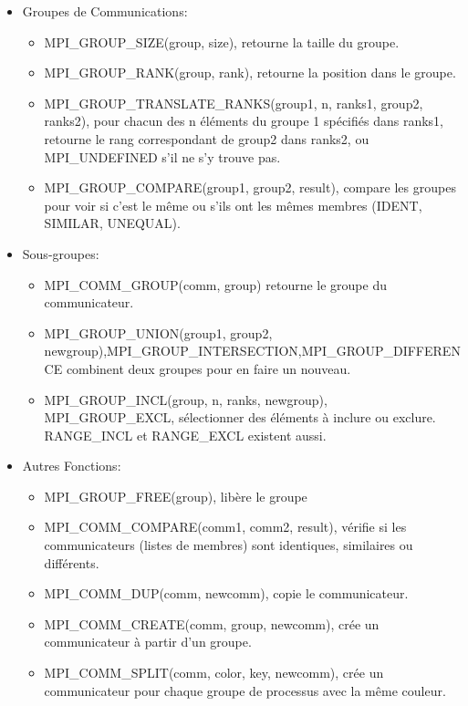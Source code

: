 \documentclass[oneside]{book}
\begin{document}
\begin{itemize}
\item Groupes de Communications:\\
\begin{itemize}
\item MPI\_GROUP\_SIZE(group, size), retourne la taille du groupe.
\item MPI\_GROUP\_RANK(group, rank), retourne la position dans le groupe.
\item MPI\_GROUP\_TRANSLATE\_RANKS(group1, n, ranks1, group2,
ranks2), pour chacun des n éléments du groupe 1 spécifiés
dans ranks1, retourne le rang correspondant de group2 dans
ranks2, ou MPI\_UNDEFINED s'il ne s'y trouve pas.
\item MPI\_GROUP\_COMPARE(group1, group2, result), compare les
groupes pour voir si c'est le même ou s'ils ont les mêmes
membres (IDENT, SIMILAR, UNEQUAL).
\end{itemize}
\item Sous-groupes:\\
\begin{itemize}
\item MPI\_COMM\_GROUP(comm, group) retourne le groupe du
communicateur.
\item MPI\_GROUP\_UNION(group1, group2, newgroup),MPI\_GROUP\_INTERSECTION,MPI\_GROUP\_DIFFERENCE combinent deux groupes
pour en faire un nouveau.
\item MPI\_GROUP\_INCL(group, n, ranks, newgroup),
MPI\_GROUP\_EXCL, sélectionner des éléments à inclure
ou exclure. RANGE\_INCL et RANGE\_EXCL existent aussi.
\end{itemize}

\item Autres Fonctions:\\

\begin{itemize}
\item MPI\_GROUP\_FREE(group), libère le groupe
\item MPI\_COMM\_COMPARE(comm1, comm2, result), vérifie si les
communicateurs (listes de membres) sont identiques, similaires
ou différents.
\item MPI\_COMM\_DUP(comm, newcomm), copie le communicateur.
\item MPI\_COMM\_CREATE(comm, group, newcomm), crée un
communicateur à partir d'un groupe.
\item MPI\_COMM\_SPLIT(comm, color, key, newcomm), crée un
communicateur pour chaque groupe de processus avec la même
couleur.
\end{itemize}


\end{itemize}
\end{document}

